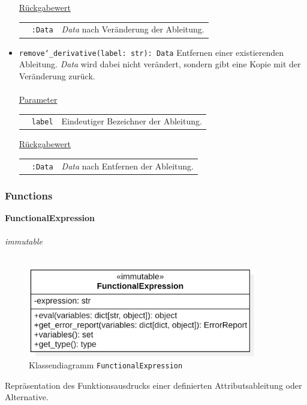\documentclass{article}
\begin{document}
\begin{itemize}
\underline{{Rückgabewert}}

\begin{tabular}{lll}
 & \texttt{:Data} & \textit{Data} nach Veränderung der Ableitung. \\
\end{tabular}


\item \texttt{remove\char`_derivative(label: str): Data} \newline Entfernen einer existierenden Ableitung. \textit{Data} wird dabei nicht verändert, sondern gibt eine Kopie mit der Veränderung zurück.
\\\\
\underline{{Parameter}}

\begin{tabular}{lll}
 & \texttt{label} & Eindeutiger Bezeichner der Ableitung. \\
\end{tabular}

\underline{{Rückgabewert}}

\begin{tabular}{lll}
 & \texttt{:Data} & \textit{Data} nach Entfernen der Ableitung. \\
\end{tabular}
\end{itemize}


\newpage
\subsubsection{Functions}
\textbf{\large{FunctionalExpression}}\\\\
\textit{\flqq{}immutable\frqq}\normalsize\\\\
\begin{figure}[H]%
    \centering
    \includegraphics[width=10cm]{entwurf/Entwurf_dokument/img/cls/model/FunctionalExpression.png}
    \caption{Klassendiagramm \texttt{FunctionalExpression}}
\end{figure}

Repräsentation des Funktionsausdrucks einer definierten Attributsableitung oder Alternative.
\newline \newline
\end{document}
